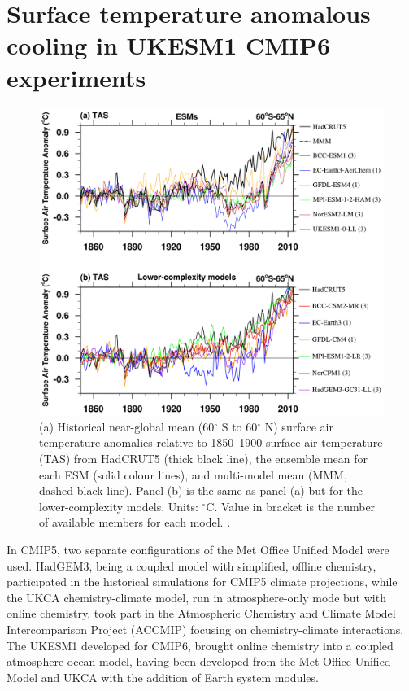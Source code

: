 \section{Surface temperature anomalous cooling in UKESM1 CMIP6 experiments}

\begin{figure}
    \centering
    \includegraphics[width=6in]{Chapter1/figs/pothole_figure_Zhang2021.png}
    \caption[Anomalous cooling in the Earth system models participating in CMIP6]{(a) Historical near-global mean (60$^\circ$ S to 60$^\circ$ N) surface air temperature anomalies relative to 1850--1900 surface air temperature (TAS) from HadCRUT5 (thick black line), the ensemble mean for each ESM (solid colour lines), and multi-model mean (MMM, dashed black line). Panel (b) is the same as panel (a) but for the lower-complexity models. Units: $^\circ$C. Value in bracket is the number of available members for each model. \citep{zhangRoleAnthropogenicAerosols2021}.}
    \label{fig:zhang-pothole}
\end{figure}

In CMIP5, two separate configurations of the Met Office Unified Model were used. HadGEM3, being a coupled model with simplified, offline chemistry, participated in the historical simulations for CMIP5 climate projections,  while the UKCA chemistry-climate model, run in atmosphere-only mode but with online chemistry, took part in the Atmospheric Chemistry and Climate Model Intercomparison Project (ACCMIP) focusing on chemistry-climate interactions. The UKESM1 developed for CMIP6, brought online chemistry into a coupled atmosphere-ocean model, having been developed from the Met Office Unified Model and UKCA with the addition of Earth system modules.


